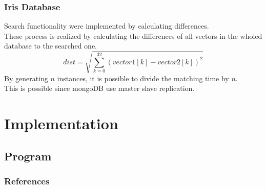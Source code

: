 \documentclass{beamer}
\begin{document}
\begin{frame}
\frametitle{Iris Database}
Search functionality were implemented by calculating differences.\\
These process is realized by calculating the differences of all vectors in the wholed database to the searched one.\\
\[
dist = \sqrt{\sum_{k=0}^{32}{(vector1[k]-vector2[k])}^2}
\]
By generating $n$ instances, it is possible to divide the matching time by $n$.\\
This is possible since mongoDB use master slave replication.
\end{frame}

\section{Implementation}
\subsection{Program}
\begin{frame}
\end{frame}
\begin{frame}
    [allowframebreaks] \frametitle{References}
    
    
\end{frame}
\end{document}
